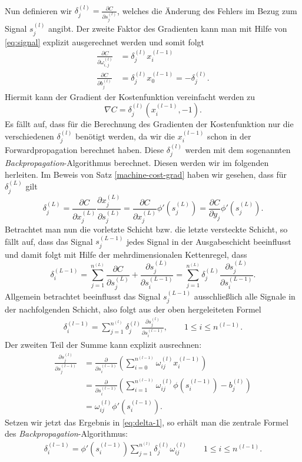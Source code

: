 \qedwhite\\
Nun definieren wir $\delta_j^{(l)}=\frac{\partial C}{\partial s_{j}^{(l)}}$, welches die Änderung des Fehlers im Bezug zum Signal
$s_j^{(l)}$ angibt. Der zweite Faktor des Gradienten kann man mit Hilfe von \eqref{eq:signal} explizit ausgerechnet
werden und somit folgt
\begin{align*}
    \frac{\partial C}{\partial \omega_{i,j}^{(l)}} &= \delta_j^{(l)} x_i^{(l-1)} \\
    \frac{\partial C}{\partial b_j^{(l)}} &= \delta_j^{(l)} x_{0}^{(l-1)} = -\delta_j^{(l)}.
\end{align*}
Hiermit kann der Gradient der Kostenfunktion vereinfacht werden zu
\[
    \nabla C=\delta_j^{(l)}(x_i^{(l-1)},-1).
\]
Es fällt auf, dass für die Berechnung des Gradienten der Kostenfunktion nur die verschiedenen $\delta_j^{(l)}$ benötigt
werden, da wir die $x_i^{(l-1)}$ schon in der Forwardpropagation berechnet haben. Diese $\delta_j^{(l)}$ werden mit dem
sogenannten \textit{Backpropagation}-Algorithmus berechnet. Diesen werden wir im folgenden herleiten. Im Beweis
von Satz \eqref{machine-cost-grad} haben wir gesehen, dass für $\delta_j^{(L)}$ gilt
\[
    \delta_j^{(L)}= \frac{\partial C}{\partial x_j^{(L)}} \frac{\partial x_j^{(L)}}{\partial s_j^{(L)}}= \frac{\partial C}{\partial x_j^{(L)}} \phi '(s_j^{(L)})
    =\frac{\partial C}{\partial y_j} \phi '(s_j^{(L)}).
\]
Betrachtet man nun die vorletzte Schicht bzw. die letzte versteckte Schicht, so fällt auf, dass das Signal
$s_j^{(L-1)}$ jedes Signal in der Ausgabeschicht beeinflusst und damit folgt mit Hilfe der mehrdimensionalen
Kettenregel, dass
\[
    \delta_i^{(L-1)}= \sum\limits_{j=1}^{n^{(L)}} \frac{\partial C}{\partial s_j^{(L)}}
    +\frac{\partial s_j^{(L)}}{\partial s_i^{(L-1)}}
    = \sum\limits_{j=1}^{n^{(L)}} \delta_j^{(L)} \frac{\partial s_j^{(L)}}{\partial s_i^{(L-1)}}.
\]
Allgemein betrachtet beeinflusst das Signal $s_j^{(L-1)}$ ausschließlich alle Signale in der nachfolgenden Schicht,
also folgt aus der oben hergeleiteten Formel
\begin{align}
    \delta_i^{(l-1)}= \sum\limits_{j=1}^{n^{(l)}} \delta_j^{(l)} \frac{\partial s_j^{(l)}}{\partial s_i^{(l-1)}},
    \qquad 1 \leq i \leq n^{(l-1)}. \label{eq:delta-1}
\end{align}
Der zweiten Teil der Summe kann explizit ausrechnen:
\begin{align*}
    \frac{\partial s_j^{(l)}}{\partial s_j^{(l-1)}}
    &= \frac{\partial}{\partial s_i^{(l-1)}} (\sum\limits_{i=0}^{n^{(l-1)}}\omega_{ij}^{(l)}x_{i}^{(l-1)})\\
    &= \frac{\partial}{\partial s_i^{(l-1)}} (\sum\limits_{i=1}^{n^{(l-1)}}\omega_{ij}^{(l)}\phi(s_{i}^{(l-1)}) - b_j^{(l)}) \\
    &= \omega_{ij}^{(l)}\phi'(s_i^{(l-1)}).
\end{align*}
Setzen wir jetzt das Ergebnis in \eqref{eq:delta-1}, so erhält man die zentrale Formel des
\textit{Backpropagation}-Algorithmus:
\begin{align}
    \delta_i^{(l-1)} = \phi'(s_i^{(l-1)})\sum\limits_{j=1}^{n^{(l)}} \delta_j^{(l)}\omega_{ij}^{(l)}
    \qquad 1 \leq i \leq n^{(l-1)}. \label{eq:delta-final}
\end{align}

